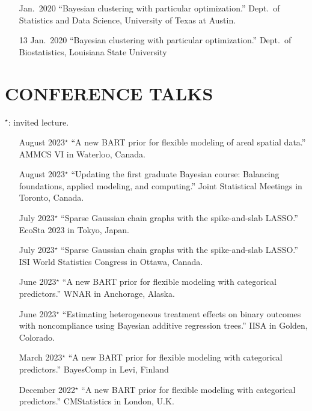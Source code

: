 \documentclass[margin]{res}
\begin{document}
\begin{resume}
\begin{itemize}
\item[Jan.~2020]{``Bayesian clustering with particular optimization.'' Dept.~of Statistics and Data Science, University of Texas at Austin.}

\item[13 Jan.~2020]{``Bayesian clustering with particular optimization.'' Dept.~of Biostatistics, Louisiana State University}


\end{itemize}

\section{CONFERENCE TALKS}
\vspace{0.1in}
$^{\star}$: invited lecture.

\vspace{0.1in}
\begin{itemize}

\item[August 2023$^{\star}$]{``A new BART prior for flexible modeling of areal spatial data.'' AMMCS VI in Waterloo, Canada.}

\item[August 2023$^{\star}$]{``Updating the first graduate Bayesian course: Balancing foundations, applied modeling, and computing.'' Joint Statistical Meetings in Toronto, Canada.}

\item[July 2023$^{\star}$]{``Sparse Gaussian chain graphs with the spike-and-slab LASSO.'' EcoSta 2023 in Tokyo, Japan.}

\item[July 2023$^{\star}$]{``Sparse Gaussian chain graphs with the spike-and-slab LASSO.'' ISI World Statistics Congress in Ottawa, Canada.}

\item[June 2023$^{\star}$]{``A new BART prior for flexible modeling with categorical predictors.'' WNAR in Anchorage, Alaska.}

\item[June 2023$^{\star}$]{``Estimating heterogeneous treatment effects on binary outcomes with noncompliance using Bayesian additive regression trees.'' IISA in Golden, Colorado.}

\item[March 2023$^{\star}$]{``A new BART prior for flexible modeling with categorical predictors.'' BayesComp in Levi, Finland}

\item[December 2022$^{\star}$]{``A new BART prior for flexible modeling with categorical predictors.'' CMStatistics in London, U.K.}


\end{itemize}
\end{resume}
\end{document}

